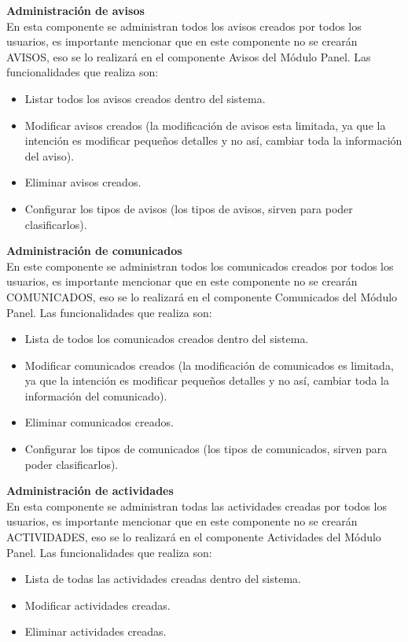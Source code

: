 \documentclass[10pt,letterpaper,twoside]{article}
\newcommand{\ctext}[1]{
    \vspace{5mm}
    {{\textcolor{titlecolor}{\large{\textbf{\textsf{#1}}}}}}
    \\
}
\begin{document}
\begin{multicols}{2}
\ctext{Administración de avisos}
En esta componente se administran todos los avisos creados por todos los usuarios, es importante mencionar que en este componente no se crearán AVISOS, eso se lo realizará en el componente Avisos del Módulo Panel.
Las funcionalidades que realiza son:
\begin{itemize}
    \item Listar todos los avisos creados dentro del sistema.
    \item Modificar avisos creados (la modificación de avisos esta limitada, ya que la intención es modificar pequeños detalles y no así, cambiar toda la información del aviso).
    \item Eliminar avisos creados.
    \item Configurar los tipos de avisos (los tipos de avisos, sirven para poder clasificarlos).
\end{itemize}

\ctext{Administración de comunicados}
En este componente se administran todos los comunicados creados por todos los usuarios, es importante mencionar que en este componente no se crearán COMUNICADOS, eso se lo realizará en el componente Comunicados del Módulo Panel.
Las funcionalidades que realiza son:
\begin{itemize}
    \item Lista de todos los comunicados creados dentro del sistema.
    \item Modificar comunicados creados (la modificación de comunicados es limitada, ya que la intención es modificar pequeños detalles y no así, cambiar toda la información del comunicado).
    \item Eliminar comunicados creados.
    \item Configurar los tipos de comunicados (los tipos de comunicados, sirven para poder clasificarlos).
\end{itemize}

\ctext{Administración de actividades}
En esta componente se administran todas las actividades creadas por todos los usuarios, es importante mencionar que en este componente no se crearán ACTIVIDADES, eso se lo realizará en el componente Actividades del Módulo Panel.
Las funcionalidades que realiza son:
\begin{itemize}
    \item Lista de todas las actividades creadas dentro del sistema.
    \item Modificar actividades creadas.
    \item Eliminar actividades creadas.
\end{itemize}


\end{multicols}
\end{document}
